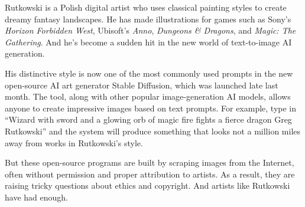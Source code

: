 \documentclass[12pt,a4paper]{article}
\begin{document}
\begin{reading}




\begin{examtext}
Rutkowski is a Polish digital artist who uses classical painting styles to create dreamy fantasy landscapes. He has made illustrations for games such as Sony's \textit{Horizon Forbidden West}, Ubisoft's \textit{Anno}, \textit{Dungeons \& Dragons}, and \textit{Magic: The Gathering}. And he's become a sudden hit in the new world of text-to-image AI generation.

His distinctive style is now one of the most commonly used prompts in the new open-source AI art generator Stable Diffusion, which was launched late last month. The tool, along with other popular image-generation AI models, allows anyone to create impressive images based on text prompts. For example, type in ``Wizard with sword and a glowing orb of magic fire fights a fierce dragon Greg Rutkowski'' and the system will produce something that looks not a million miles away from works in Rutkowski's style.

But these open-source programs are built by scraping images from the Internet, often without permission and proper attribution to artists. As a result, they are raising tricky questions about ethics and copyright. And artists like Rutkowski have had enough.


\end{examtext}
\end{reading}
\end{document}
